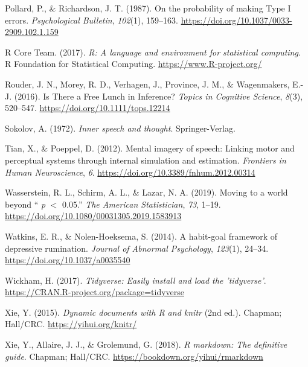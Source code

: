 \documentclass[
  english,
  man, donotrepeattitle,mask,floatsintext]{apa6}
\newlength{\cslhangindent}
\newlength{\cslentryspacingunit} %
\newenvironment{CSLReferences}[2] %
 {%
  \setlength{\parindent}{0pt}
  \ifodd #1
  \let\oldpar\par
  \def\par{\hangindent=\cslhangindent\oldpar}
  \fi
  \setlength{\parskip}{#2\cslentryspacingunit}
 }%
 {}
\begin{document}
\begin{CSLReferences}{1}{0}
\leavevmode{}%
Pollard, P., \& Richardson, J. T. (1987). On the probability of making {Type I} errors. \emph{Psychological Bulletin}, \emph{102}(1), 159--163. \url{https://doi.org/10.1037/0033-2909.102.1.159}

\leavevmode{}%
R Core Team. (2017). \emph{R: A language and environment for statistical computing}. R Foundation for Statistical Computing. \url{https://www.R-project.org/}

\leavevmode{}%
Rouder, J. N., Morey, R. D., Verhagen, J., Province, J. M., \& Wagenmakers, E.-J. (2016). Is {There} a {Free Lunch} in {Inference}? \emph{Topics in Cognitive Science}, \emph{8}(3), 520--547. \url{https://doi.org/10.1111/tops.12214}

\leavevmode{}%
Sokolov, A. (1972). \emph{Inner speech and thought}. {Springer-Verlag}.

\leavevmode{}%
Tian, X., \& Poeppel, D. (2012). Mental imagery of speech: Linking motor and perceptual systems through internal simulation and estimation. \emph{Frontiers in Human Neuroscience}, \emph{6}. \url{https://doi.org/10.3389/fnhum.2012.00314}

\leavevmode{}%
Wasserstein, R. L., Schirm, A. L., \& Lazar, N. A. (2019). Moving to a world beyond {`` {\emph{p}} {\(<\)} 0.05.''} \emph{The American Statistician}, \emph{73}, 1--19. \url{https://doi.org/10.1080/00031305.2019.1583913}

\leavevmode{}%
Watkins, E. R., \& Nolen-Hoeksema, S. (2014). A habit-goal framework of depressive rumination. \emph{Journal of Abnormal Psychology}, \emph{123}(1), 24--34. \url{https://doi.org/10.1037/a0035540}

\leavevmode{}%
Wickham, H. (2017). \emph{Tidyverse: Easily install and load the 'tidyverse'}. \url{https://CRAN.R-project.org/package=tidyverse}

\leavevmode{}%
Xie, Y. (2015). \emph{Dynamic documents with {R} and knitr} (2nd ed.). Chapman; Hall/CRC. \url{https://yihui.org/knitr/}

\leavevmode{}%
Xie, Y., Allaire, J. J., \& Grolemund, G. (2018). \emph{R markdown: The definitive guide}. Chapman; Hall/CRC. \url{https://bookdown.org/yihui/rmarkdown}

\end{CSLReferences}
\end{document}
